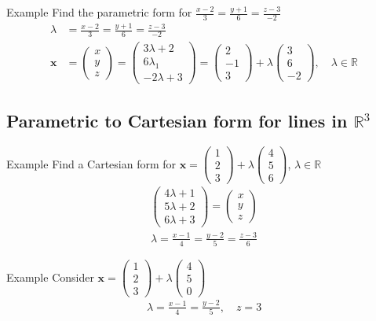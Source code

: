 \documentclass{report}
\newcommand{\cvec}[1]{ \begin{pmatrix} #1 \end{pmatrix} }
\begin{document}
		\begin{question}{Example}
			Find the parametric form for $\frac{x-2}{3} = \frac{y+1}{6} = \frac{z-3}{-2}$
			\begin{align*}
				\lambda &= \frac{x-2}{3} = \frac{y+1}{6} = \frac{z-3}{-2}	\\
				\mathbf{x} &= \cvec{x\\y\\z} = \cvec{3\lambda+2\\6\lambda_1\\-2\lambda+3} = \cvec{2\\-1\\3} + \lambda \cvec{3\\6\\-2}, \quad \lambda \in \mathbb{R}
			\end{align*}
		\end{question}

	\subsection{Parametric to Cartesian form for lines in $\mathbb{R}^3$}

		\begin{question}{Example}
			Find a Cartesian form for $\mathbf{x} = \cvec{1\\2\\3} + \lambda \cvec{4\\5\\6}$, $\lambda \in \mathbb{R}$
			\begin{align*}
				\cvec{4\lambda+1\\5\lambda+2\\6\lambda+3} = \cvec{x\\y\\z}
			\end{align*}
			\begin{align*}
				\lambda = \frac{x-1}{4} = \frac{y-2}{5} = \frac{z-3}{6}
			\end{align*}
		\end{question}
		\begin{question}{Example}
			Consider $\mathbf{x} = \cvec{1\\2\\3} + \lambda \cvec{4\\5\\0}$
			\begin{align*}
				\lambda = \frac{x-1}{4} = \frac{y-2}{5}, \quad z=3
			\end{align*}
		\end{question}
\end{document}
